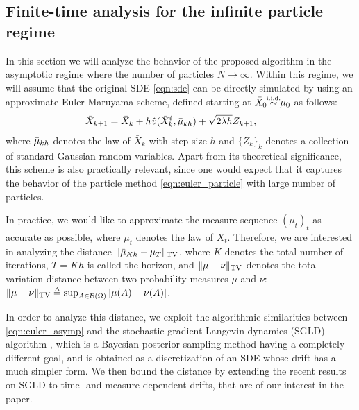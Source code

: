 
\subsection{Finite-time analysis for the infinite particle regime}
In this section we will analyze the behavior of the proposed algorithm in the asymptotic regime where the number of particles $N \rightarrow \infty$. Within this regime, we will assume that the original SDE \eqref{eqn:sde} can be directly simulated by using an approximate Euler-Maruyama scheme, defined starting at $\bar{X}_0 \simiid \mu_0$ as follows:
\begin{align}
 \bar{X}_{k+1} = \bar{X}_k + h \hspace{0.5pt} \hat{v}(\bar{X}^i_k, \bar{\mu}_{kh} ) + \sqrt{2 \lambda h} Z_{k+1}, \qquad \label{eqn:euler_asymp}
\end{align}
where $\bar{\mu}_{kh}$ denotes the law of $\bar{X}_k$ with step size $h$ and $\{Z_k\}_{k}$ denotes a collection of standard Gaussian random variables. Apart from its theoretical significance, this scheme is also practically relevant, since one would expect that it captures the behavior of the particle method \eqref{eqn:euler_particle} with large number of particles. 

In practice, we would like to approximate the measure sequence $(\mu_t)_t$ as accurate as possible, where $\mu_t$ denotes the law of $X_t$. Therefore, we are interested in analyzing the distance $\| \bar{\mu}_{Kh} - \mu_{T} \|_{\textnormal{TV}}$, where $K$ denotes the total number of iterations, $T=Kh$ is called the horizon, and $\|\mu-\nu\|_{\textnormal{TV}}$ denotes the total variation distance between two probability measures $\mu$ and $\nu$: 
$\|\mu-\nu\|_{\textnormal{TV}}\triangleq \sup_{A \in {\cal B}(\Omega)} |\mu(A) -\nu(A) |$.
 

In order to analyze this distance, we exploit the algorithmic similarities between \eqref{eqn:euler_asymp} and the stochastic gradient Langevin dynamics (SGLD) algorithm \cite{WelTeh2011a}, which is a Bayesian posterior sampling method having a completely different goal, and is obtained as a discretization of an SDE whose drift has a much simpler form. We then bound the distance by extending the recent results on SGLD \cite{raginsky17a} to time- and measure-dependent drifts, that are of our interest in the paper.

